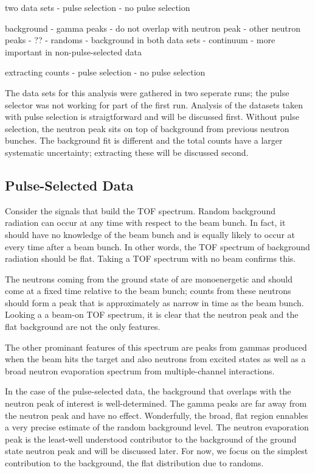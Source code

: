 two data sets
- pulse selection
- no pulse selection

background
- gamma peaks - do not overlap with neutron peak
- other neutron peaks - ??
- randoms - background in both data sets
- continuum - more important in non-pulse-selected data

extracting counts 
- pulse selection
- no pulse selection

The data sets for this analysis were gathered in two seperate runs; the pulse selector was not working for part of the first run.  Analysis of the datasets taken with pulse selection is straigtforward and will be discussed first.  Without pulse selection, the neutron peak sits on top of background from previous neutron bunches.  The background fit is different and the total counts have a larger systematic uncertainty; extracting these will be discussed second.

\subsection{Pulse-Selected Data}
Consider the signals that build the TOF spectrum.  Random background radiation can occur at any time with respect to the beam bunch.  In fact, it should have no knowledge of the beam bunch and is equally likely to occur at every time after a beam bunch.  In other words, the TOF spectrum of background radiation should be flat.  Taking a TOF spectrum with no beam confirms this.


The neutrons coming from the ground state of  are monoenergetic and should come at a fixed time relative to the beam bunch; counts from these neutrons should form a peak that is approximately as narrow in time as the beam bunch.  Looking a a beam-on TOF spectrum, it is clear that the neutron peak and the flat background are not the only features.


The other prominant features of this spectrum are peaks from gammas produced when the beam hits the target and also neutrons from excited states as well as a broad neutron evaporation spectrum from multiple-channel interactions.

In the case of the pulse-selected data, the background that overlaps with the neutron peak of interest is well-determined.  The gamma peaks are far away from the neutron peak and have no effect.  Wonderfully, the broad, flat region ennables a very precise estimate of the random background level.  The neutron evaporation peak is the least-well understood contributor to the background of the ground state neutron peak and will be discussed later.  For now, we focus on the simplest contribution to the background, the flat distribution due to randoms.

